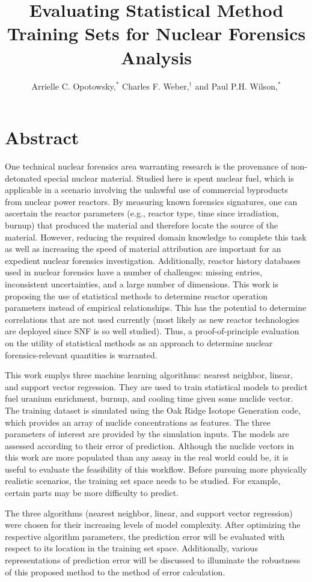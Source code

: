 \documentclass{anstrans}
\title{Evaluating Statistical Method Training Sets for Nuclear Forensics Analysis}
\author{Arrielle C. Opotowsky,$^{*}$ Charles F. Weber,$^{\dagger}$ and Paul P.H. Wilson,$^{*}$}
\institute{
$^{*}$Computational Nuclear Engineering Research Group, University of Wisconsin--Madison, Madison, WI, opotowsky@wisc.edu, paul.wilson@wisc.edu
\and
$^{\dagger}$Nuclear Security Modeling Group, Oak Ridge National Laboratory, Oak Ridge, TN, webercf@ornl.gov
}
\begin{document}
\section{Abstract}

One technical nuclear forensics area warranting research is the provenance of
non-detonated special nuclear material. Studied here is spent nuclear fuel,
which is applicable in a scenario involving the unlawful use of commercial
byproducts from nuclear power reactors. By measuring known forensics
signatures, one can ascertain the reactor parameters (e.g., reactor type, time
since irradiation, burnup) that produced the material and therefore locate the
source of the material. However, reducing the required domain knowledge to
complete this task as well as increasing the speed of material attribution are
important for an expedient nuclear forensics investigation. Additionally,
reactor history databases used in nuclear forensics have a number of
challenges: missing entries, inconsistent uncertainties, and a large number of
dimensions. This work is proposing the use of statistical methods to determine
reactor operation parameters instead of empirical relationships. This has the
potential to determine correlations that are not used currently (most likely as
new reactor technologies are deployed since SNF is so well studied). Thus, a
proof-of-principle evaluation on the utility of statistical methods as an
approach to determine nuclear forensics-relevant quantities is warranted.

This work emplys three machine learning algorithms: nearest neighbor, linear,
and support vector regression. They are used to train statistical models to
predict fuel uranium enrichment, burnup, and cooling time given some nuclide
vector. The training dataset is simulated using the Oak Ridge Isotope
Generation code, which provides an array of nuclide concentrations as features.
The three parameters of interest are provided by the simulation inputs. The
models are assessed according to their error of prediction. Although the
nuclide vectors in this work are more populated than any assay in the real
world could be, it is useful to evaluate the feasibility of this workflow.
Before pursuing more physically realistic scenarios, the training set space
needs to be studied. For example, certain parts may be more difficulty to
predict.

The three algorithms (nearest neighbor, linear, and support vector regression)
were chosen for their increasing levels of model complexity. After optimizing
the respective algorithm parameters, the prediction error will be evaluated
with respect to its location in the training set space. Additionally, various
representations of prediction error will be discussed to illuminate the
robustness of this proposed method to the method of error calculation.
\end{document}
